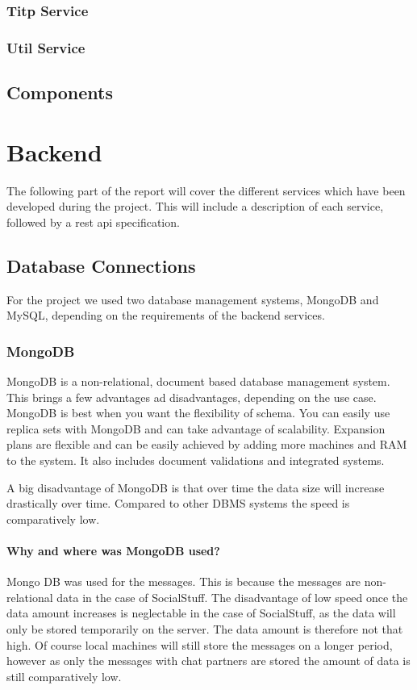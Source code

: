 \subsubsection{Titp Service}

\subsubsection{Util Service}

\subsection{Components}\label{subsec:components}


\section{Backend}\label{sec:backend}

The following part of the report will cover the different services which have been developed during the project.
This will include a description of each service, followed by a \ac{rest} \ac{api} specification.

\subsection{Database Connections}\label{subsec:database-connections}

For the project we used two database management systems, MongoDB and MySQL, depending on the requirements of the backend
services.

\subsubsection{MongoDB}
MongoDB is a non-relational, document based database management system.
This brings a few advantages ad disadvantages, depending on the use case.
MongoDB is best when you want the flexibility of schema.
You can easily use replica sets with MongoDB and can take advantage of scalability.
Expansion plans are flexible and can be easily achieved by adding more machines and RAM to the system.
It also includes document validations and integrated systems.

A big disadvantage of MongoDB is that over time the data size will increase drastically over time.
Compared to other DBMS systems the speed is comparatively low.

\paragraph{Why and where was MongoDB used?}
Mongo DB was used for the messages.
This is because the messages are non-relational data in the case of SocialStuff.
The disadvantage of low speed once the data amount increases is neglectable in the case of SocialStuff, as the data will
only be stored temporarily on the server.
The data amount is therefore not that high.
Of course local machines will still store the messages on a longer period, however as only the messages with chat
partners are stored the amount of data is still comparatively low.

